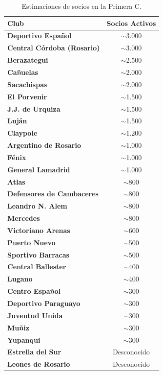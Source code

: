 \begin{table}[h!]
\centering
\renewcommand{\arraystretch}{1.1}
\begin{tabularx}{\textwidth}{|X|c|}
\hline
\rowcolor{gray!20} \textbf{Club} & \textbf{Socios Activos} \\ \hline
\textbf{Deportivo Español} & $\sim$3.000 \\ \hline
\textbf{Central Córdoba (Rosario)} & $\sim$3.000 \\ \hline
\textbf{Berazategui} & $\sim$2.500 \\ \hline
\textbf{Cañuelas} & $\sim$2.000 \\ \hline
\textbf{Sacachispas} & $\sim$2.000 \\ \hline
\textbf{El Porvenir} & $\sim$1.500 \\ \hline
\textbf{J.J. de Urquiza} & $\sim$1.500 \\ \hline
\textbf{Luján} & $\sim$1.500 \\ \hline
\textbf{Claypole} & $\sim$1.200 \\ \hline
\textbf{Argentino de Rosario} & $\sim$1.000 \\ \hline
\textbf{Fénix} & $\sim$1.000 \\ \hline
\textbf{General Lamadrid} & $\sim$1.000 \\ \hline
\textbf{Atlas} & $\sim$800 \\ \hline
\textbf{Defensores de Cambaceres} & $\sim$800 \\ \hline
\textbf{Leandro N. Alem} & $\sim$800 \\ \hline
\textbf{Mercedes} & $\sim$800 \\ \hline
\textbf{Victoriano Arenas} & $\sim$600 \\ \hline
\textbf{Puerto Nuevo} & $\sim$500 \\ \hline
\textbf{Sportivo Barracas} & $\sim$500 \\ \hline
\textbf{Central Ballester} & $\sim$400 \\ \hline
\textbf{Lugano} & $\sim$400 \\ \hline
\textbf{Centro Español} & $\sim$300 \\ \hline
\textbf{Deportivo Paraguayo} & $\sim$300 \\ \hline
\textbf{Juventud Unida} & $\sim$300 \\ \hline
\textbf{Muñiz} & $\sim$300 \\ \hline
\textbf{Yupanqui} & $\sim$300 \\ \hline
\textbf{Estrella del Sur} & Desconocido \\ \hline
\textbf{Leones de Rosario} & Desconocido \\ \hline
\end{tabularx}
\caption{Estimaciones de socios en la Primera C.}
\label{tab:anexo_primera_c}
\end{table}

